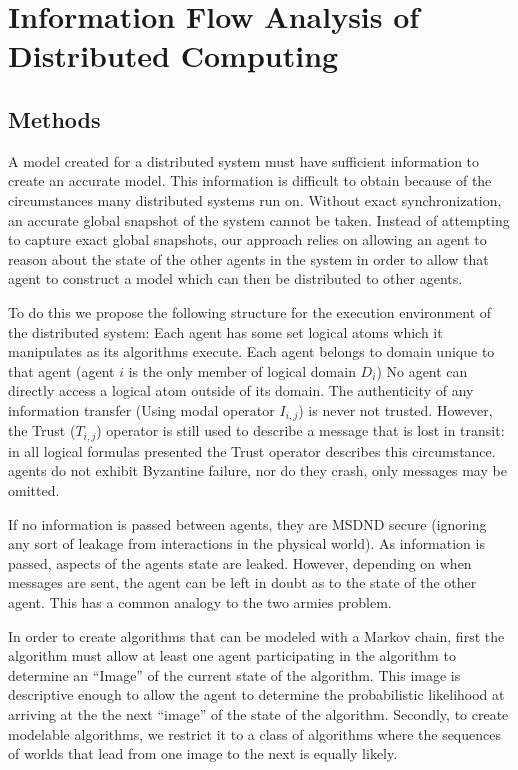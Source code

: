 

\chapter{Information Flow Analysis of Distributed Computing}


\section{Methods}

A model created for a distributed system must have sufficient information to create an accurate model. This information is difficult to obtain because of the circumstances many distributed systems run on. Without exact synchronization, an accurate global snapshot of the system cannot be taken. Instead of attempting to capture exact global snapshots, our approach relies on allowing an agent to reason about the state of the other agents in the system in order to allow that agent to construct a model which can then be distributed to other agents.


To do this we propose the following structure for the execution environment of the distributed system:
Each agent has some set logical atoms which it manipulates as its algorithms execute.
Each agent belongs to domain unique to that agent (agent $i$ is the only member of logical domain $D_i$)
No agent can directly access a logical atom outside of its domain.
The authenticity of any information transfer (Using modal operator $I_{i,j}$) is never not trusted. However, the Trust ($T_{i,j}$) operator is still used to describe a message that is lost in transit: in all logical formulas presented the Trust operator describes this circumstance.
agents do not exhibit Byzantine failure, nor do they crash, only messages may be omitted.

If no information is passed between agents, they are MSDND secure (ignoring any sort of leakage from interactions in the physical world). As information is passed, aspects of the agents state are leaked. However, depending on when messages are sent, the agent can be left in doubt as to the state of the other agent. This has a common analogy to the two armies problem. 

In order to create algorithms that can be modeled with a Markov chain, first the algorithm must allow at least one agent participating in the algorithm to determine an ``Image'' of the current state of the algorithm. This image is descriptive enough to allow the agent to determine the probabilistic likelihood at arriving at the the next ``image'' of the state of the algorithm. Secondly, to create modelable algorithms, we restrict it to a class of algorithms where the sequences of worlds that lead from one image to the next is equally likely.

